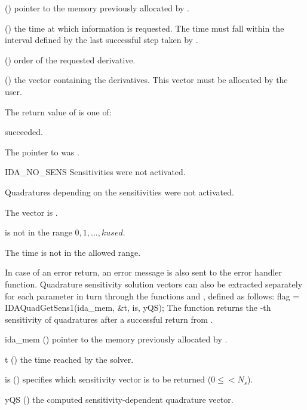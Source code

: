 {
  \begin{args}
  \item[\id{ida\_mem}] ()
    pointer to the memory previously allocated by .
  \item[\id{t}] ()
    the time at which information is requested. The time  must fall within the 
    interval defined by the last successful step taken by {\idas}.
  \item[\id{k}] () order of the requested derivative.
  \item[\id{dkyQS}] ()
    the vector containing the derivatives. This vector must be allocated by the user. 
  \end{args}
}
{
  The return value  of  is one of:
  \begin{args}
  \item[\Id{IDA\_SUCCESS}]
     succeeded.
  \item[\Id{IDA\_MEM\_NULL}]
    The pointer to  was .
  \item[IDA\_NO\_SENS]
    Sensitivities were not activated.
  \item[\Id{IDA\_NO\_QUADSENS}] 
    Quadratures depending on the sensitivities were not activated.
  \item[\Id{IDA\_BAD\_DKY}] 
    The vector  is .
  \item[\Id{IDA\_BAD\_K}]
     is not in the range $0, 1, ..., kused$.
  \item[\Id{IDA\_BAD\_T}] 
    The time  is not in the allowed range.
  \end{args}
}
{
  In case of an error return, an error message is also sent to the error handler function.
}
Quadrature sensitivity solution vectors can also be extracted separately for 
each parameter in turn through the functions  and
, defined as follows:
{
  flag = IDAQuadGetSens1(ida\_mem, \&t, is, yQS);
}
{
  The function  returns the -th sensitivity 
  of quadratures after a successful return from .
}
{
  \begin{args}
  \item[ida\_mem] ()
    pointer to the memory previously allocated by .
  \item[t] ()
    the time reached by the solver.
  \item[is] () specifies which sensitivity vector is to be returned
    ($0\le$$< N_s$).
  \item[yQS] ()
    the computed sensitivity-dependent quadrature vector.
  \end{args}
}
